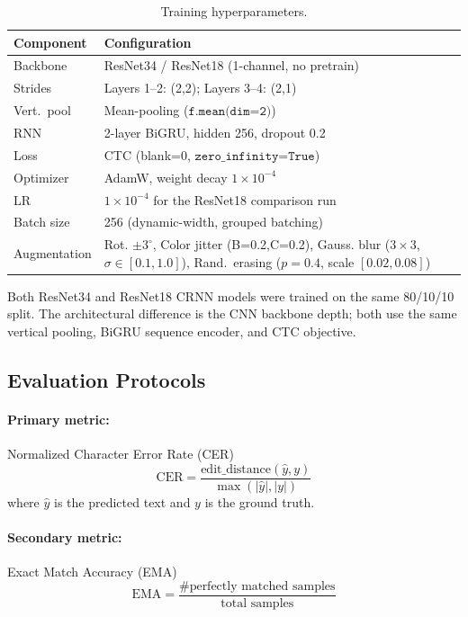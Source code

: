 \documentclass[conference]{IEEEtran}
\begin{document}
\begin{table}[htbp]
\centering
\caption{Training hyperparameters.}
\label{tab:hyperparams}
\begin{tabularx}{\columnwidth}{@{}l X@{}} 
\toprule
\textbf{Component} & \textbf{Configuration} \\ 
\midrule
Backbone & ResNet34 / ResNet18 (1-channel, no pretrain) \\ 
Strides & Layers 1--2: (2,2); Layers 3--4: (2,1) \\ 
Vert.\ pool & Mean-pooling ($\texttt{f.mean(dim=2)}$) \\ 
RNN & 2-layer BiGRU, hidden 256, dropout 0.2 \\ 
Loss & CTC (blank=0, $\texttt{zero\_infinity=True}$)~\cite{graves2006} \\ 
Optimizer & AdamW, weight decay $1\times10^{-4}$ \\ 
LR & $1\times10^{-4}$ for the ResNet18 comparison run \\ 
Batch size & 256 (dynamic-width, grouped batching) \\ 
Augmentation & Rot. $\pm3^\circ$, Color jitter (B=0.2,C=0.2), Gauss. blur ($3\times3$, $\sigma\in[0.1,1.0]$), Rand.\ erasing ($p=0.4$, scale $[0.02,0.08]$) \\ 
\bottomrule
\end{tabularx}
\end{table}

Both ResNet34 and ResNet18 CRNN models were trained on the same 80/10/10 split.
The architectural difference is the CNN backbone depth; both use the same
vertical pooling, BiGRU sequence encoder, and CTC objective.
\subsection{Evaluation Protocols}

\paragraph{Primary metric:} Normalized Character Error Rate (CER)
\begin{equation}
\text{CER} = \frac{\text{edit\_distance}(\hat{y}, y)}{\max(|\hat{y}|, |y|)}
\end{equation}
where $\hat{y}$ is the predicted text and $y$ is the ground truth.

\paragraph{Secondary metric:} Exact Match Accuracy (EMA)
\begin{equation}
\text{EMA} = \frac{\text{\# perfectly matched samples}}{\text{total samples}}
\end{equation}
\end{document}
